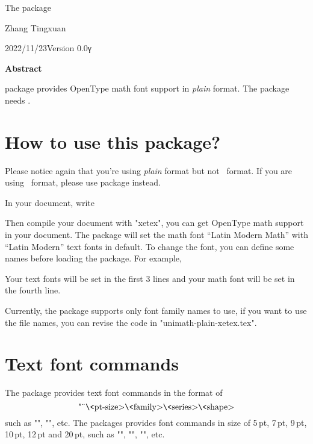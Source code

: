 \centerline{\twentyrm The 
  package}
\biggskip

\centerline{Zhang Tingxuan}
\medskip

\centerline{2022/11/23\quad Version 0.0γ}
\biggskip

\centerline{\bf Abstract}
\medskip
{\sf\umpx} package provides OpenType math font support in {\it plain \tex\/} 
format. The {\sf\umpx} package needs \xetex.

\section{How to use this package?}
Please notice again that you're using {\it plain\/} format but not 
\latex\ format. If you are using \latex\ format, please use 
 package instead.

In your document, write
\begintt

\endtt
Then compile your document with "xetex", you can get OpenType math support 
in your document. The package will set the math font ``Latin Modern Math'' 
with ``Latin Modern'' text fonts in default. To change the font, you can 
define some names before loading the package. For example,
\begintt
\def\mainfontname{TeX Gyre Termes}
\def\sansfontname{TeX Gyre Heros}
\def\monofontname{TeX Gyre Cursors}
\def\mathfontname{TeX Gyre Termes Math}

\endtt
Your text fonts will be set in the first 3 lines and your math font will 
be set in the fourth line.

Currently, the package supports only font family names to use, if 
you want to use the file names, you can revise the code in 
"unimath-plain-xetex.tex".



\section{Text font commands}
The package provides text font commands in the format of 
$$\hbox{"\"\<pt-size>\<family>\<series>\<shape>}$$
such as "\tensfbfit", "\twelvebf", etc. The packages provides 
font commands in size of 5\,pt, 7\,pt, 9\,pt, 10\,pt, 12\,pt and 20\,pt, 
such as "\fiverm", "\sevensf", "\twelvett", etc.

